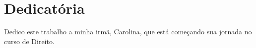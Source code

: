 \chapter*{Dedicatória}
Dedico este trabalho a minha irmã, Carolina, que est\'a começando sua jornada no curso de Direito.
